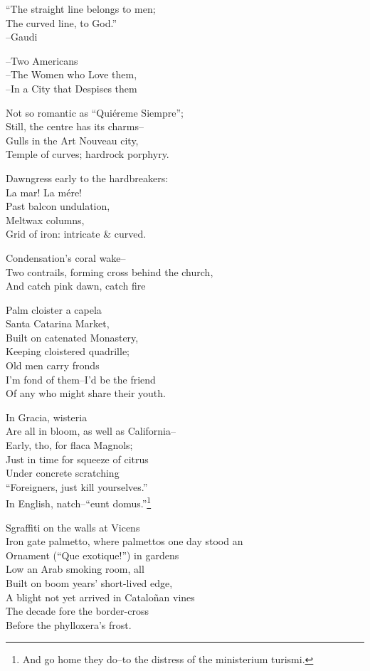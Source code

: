 ``The straight line belongs to men; \\
The curved line, to God.'' \\
\hfill --Gaudi

--Two Americans \\
--The Women who Love them, \\
--In a City that Despises them

Not so romantic as ``Quiéreme Siempre''; \\
Still, the centre has its charms-- \\
Gulls in the Art Nouveau city, \\
Temple of curves; hardrock porphyry.

Dawngress early to the hardbreakers: \\
La mar! La mére! \\
Past balcon undulation, \\
Meltwax columns, \\
Grid of iron: intricate \& curved.

Condensation's coral wake-- \\
Two contrails, forming cross behind the church, \\
And catch pink dawn, catch fire

Palm cloister a capela \\
Santa Catarina Market, \\
Built on catenated Monastery, \\
Keeping cloistered quadrille; \\
Old men carry fronds \\
I'm fond of them--I'd be the friend \\
Of any who might share their youth.

In Gracia, wisteria \\
Are all in bloom, as well as California-- \\
Early, tho, for flaca Magnols; \\
Just in time for squeeze of citrus \\
Under concrete scratching \\
``Foreigners, just kill yourselves.'' \\
In English, natch--``eunt domus.''\footnote{And go home they do--to the distress of the ministerium turismi.}

Sgraffiti on the walls at Vicens \\
Iron gate palmetto, where palmettos one day stood an \\
Ornament (``Que exotique!'') in gardens \\
Low an Arab smoking room, all \\
Built on boom years' short-lived edge, \\
A blight not yet arrived in Cataloñan vines \\
The decade fore the border-cross \\
Before the phylloxera's frost.